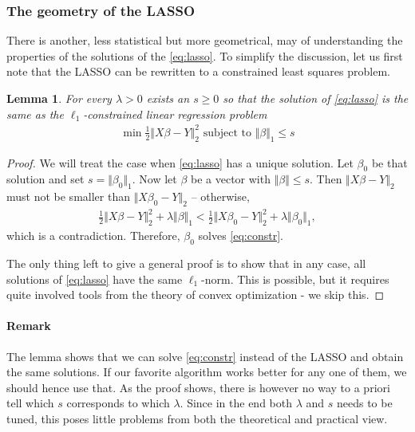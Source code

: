 \documentclass{article}
\newtheorem{lemma}{Lemma}
\newcommand{\norm}[1]{\Vert #1 \Vert}
\begin{document}
\subsubsection{The geometry of the LASSO} There is another, less statistical but more geometrical, may of  understanding the properties of the solutions of the \eqref{eq:lasso}. To simplify the discussion, let us first note that the LASSO can be rewritten to a constrained least squares problem.
\begin{lemma}
    For every $\lambda>0$ exists an $s\geq 0 $ so that the solution of \eqref{eq:lasso} is the same as the $\ell_1$-constrained linear regression problem
\begin{align}
    \min \tfrac{1}{2}\norm{X\beta-Y}_2^2 \text{ subject to } \norm{\beta}_1 \leq s \label{eq:constr}
\end{align}
\end{lemma} 
\begin{proof}
    We will treat the case when \eqref{eq:lasso} has a unique solution. Let $\beta_0$ be that solution and set $s = \norm{\beta_0}_1$. Now let $\beta$ be a vector with $\norm{\beta} \leq s$. Then $\norm{X\beta-Y}_2$ must not be smaller than $\norm{X\beta_0 -Y}_2$ -- otherwise,
    \begin{align*}
        \tfrac{1}{2}\norm{X\beta-Y}_2^2 + \lambda \norm{\beta}_1 < \tfrac{1}{2}\norm{X\beta_0-Y}_2^2 + \lambda \norm{\beta_0}_1, 
    \end{align*}
    which is a contradiction. Therefore, $\beta_0$ solves \eqref{eq:constr}. 

    The only thing left to give a general proof is to show that in any case, all solutions of \eqref{eq:lasso} have the same $\ell_1$-norm. This is possible, but it requires quite involved tools from the theory of convex optimization - we skip this.
\end{proof}

\paragraph{Remark} The lemma shows that we can solve \eqref{eq:constr} instead of the LASSO and obtain the same solutions. If our favorite algorithm works better for any one of them, we should hence use that.  As the proof shows, there is however no way to a priori tell which $s$ corresponds to which $\lambda$. Since in the end both $\lambda$ and $s$ needs to be tuned, this poses little problems from both the theoretical and practical view.
\end{document}
